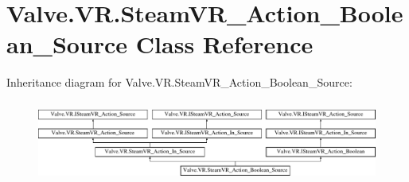 \hypertarget{class_valve_1_1_v_r_1_1_steam_v_r___action___boolean___source}{}\section{Valve.\+V\+R.\+Steam\+V\+R\+\_\+\+Action\+\_\+\+Boolean\+\_\+\+Source Class Reference}
\label{class_valve_1_1_v_r_1_1_steam_v_r___action___boolean___source}
Inheritance diagram for Valve.\+V\+R.\+Steam\+V\+R\+\_\+\+Action\+\_\+\+Boolean\+\_\+\+Source\+:\begin{figure}[H]
\begin{center}
\leavevmode
\includegraphics[height=2.735043cm]{class_valve_1_1_v_r_1_1_steam_v_r___action___boolean___source}
\end{center}
\end{figure}

